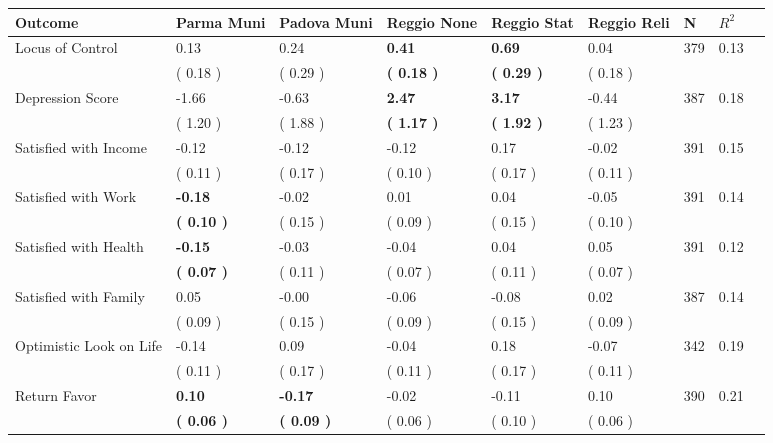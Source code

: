 \begin{tabular}{L{6.2cm} C{1.8cm} C{1.8cm} C{1.8cm} C{1.8cm} C{1.8cm} C{1.8cm} C{0.3cm} C{0.3cm}}
\toprule
 \textbf{Outcome} & \textbf{Parma Muni} & \textbf{Padova Muni} & \textbf{Reggio None} & \textbf{Reggio Stat} & \textbf{Reggio Reli} & \textbf{N} & \textbf{$ R^2$} \\
\midrule
Locus of Control &      0.13 &      0.24 & \textbf{     0.41} & \textbf{     0.69} &      0.04  & 379 &       0.13 \\ 
 & (     0.18 ) & (     0.29 ) & \textbf{(     0.18 )} & \textbf{(     0.29 )} & (     0.18 )  & \\
Depression Score &     -1.66 &     -0.63 & \textbf{     2.47} & \textbf{     3.17} &     -0.44  & 387 &       0.18 \\ 
 & (     1.20 ) & (     1.88 ) & \textbf{(     1.17 )} & \textbf{(     1.92 )} & (     1.23 )  & \\
Satisfied with Income &     -0.12 &     -0.12 &     -0.12 &      0.17 &     -0.02  & 391 &       0.15 \\ 
 & (     0.11 ) & (     0.17 ) & (     0.10 ) & (     0.17 ) & (     0.11 )  & \\
Satisfied with Work & \textbf{    -0.18} &     -0.02 &      0.01 &      0.04 &     -0.05  & 391 &       0.14 \\ 
 & \textbf{(     0.10 )} & (     0.15 ) & (     0.09 ) & (     0.15 ) & (     0.10 )  & \\
Satisfied with Health & \textbf{    -0.15} &     -0.03 &     -0.04 &      0.04 &      0.05  & 391 &       0.12 \\ 
 & \textbf{(     0.07 )} & (     0.11 ) & (     0.07 ) & (     0.11 ) & (     0.07 )  & \\
Satisfied with Family &      0.05 &     -0.00 &     -0.06 &     -0.08 &      0.02  & 387 &       0.14 \\ 
 & (     0.09 ) & (     0.15 ) & (     0.09 ) & (     0.15 ) & (     0.09 )  & \\
Optimistic Look on Life &     -0.14 &      0.09 &     -0.04 &      0.18 &     -0.07  & 342 &       0.19 \\ 
 & (     0.11 ) & (     0.17 ) & (     0.11 ) & (     0.17 ) & (     0.11 )  & \\
Return Favor & \textbf{     0.10} & \textbf{    -0.17} &     -0.02 &     -0.11 &      0.10  & 390 &       0.21 \\ 
 & \textbf{(     0.06 )} & \textbf{(     0.09 )} & (     0.06 ) & (     0.10 ) & (     0.06 )  & \\

\end{tabular}
